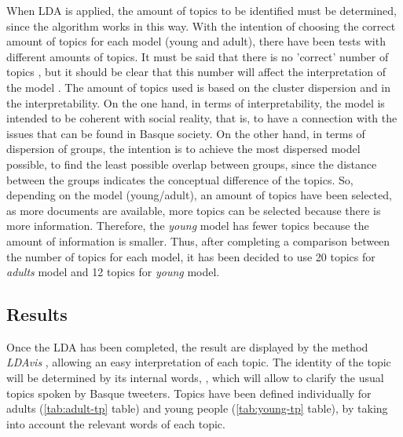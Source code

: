 \documentclass[information,article,submit,moreauthors,pdftex,10pt,a4paper]{Definitions/mdpi}
\begin{document}
When LDA is applied, the amount of topics to be identified must be determined, since the algorithm works in this way. With the intention of choosing the correct amount of topics for each model (young and adult), there have been tests with different amounts of topics. It must be said that there is no 'correct' number of topics \citep{binkley2014understanding}, but it should be clear that this number will affect the interpretation of the model \citep{steyvers2007probabilistic}. The amount of topics used is based on the cluster dispersion and in the interpretability. On the one hand, in terms of interpretability, the model is intended to be coherent with social reality, that is, to have a connection with the issues that can be found in Basque society. On the other hand, in terms of dispersion of groups, the intention is to achieve the most dispersed model possible, to find the least possible overlap between groups, since the distance between the groups indicates the conceptual difference of the topics. So, depending on the model (young/adult), an amount of topics have been selected, as more documents are available, more topics can be selected because there is more information. Therefore, the \textit{young} model has fewer topics because the amount of information is smaller. Thus, after completing a comparison between the number of topics for each model, it has been decided to use 20 topics for \textit{adults} model and 12 topics for \textit{young} model. \\

\subsection{Results}
\label{sec:emaitz analisi}
Once the LDA has been completed, the result are displayed by the method \textit{LDAvis} \citep{sievert2014ldavis}, allowing an easy interpretation of each topic. The identity of the topic will be determined by its internal words, \citep{binkley2014understanding}, which will allow to clarify the usual topics spoken by Basque tweeters. Topics have been defined individually for adults (\ref{tab:adult-tp} table) and young people (\ref{tab:young-tp} table), by taking into account the relevant words of each topic.
\end{document}
